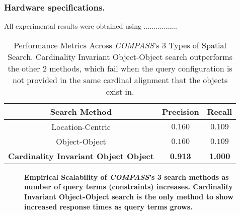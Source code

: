 \subsubsection{Hardware specifications.} 
All experimental results were obtained using .................

\small{
\begin{table}[h]
    \begin{center}
        \begin{tabular}{ |c|c|c| } 
            \hline
            Search Method & Precision & Recall\\
            \hline
            Location-Centric & $0.160$ & $0.109$ \\ 
            Object-Object & $0.160$ & $0.109$ \\  
            \textbf{Cardinality Invariant Object Object} & \textbf{0.913} & \textbf{1.000} \\ 
            \hline     
        \end{tabular}
        \caption{Performance Metrics Across \emph{COMPASS}'s 3 Types of Spatial Search. Cardinality Invariant Object-Object search outperforms the other 2 methods, which fail when the query configuration is not provided in the same cardinal alignment that the objects exist in.} 
        \label{Table:PerformanceResults}
    \end{center}
\end{table}
}

\begin{figure}[h]
    \centering
        
    \caption{\textbf{Empirical Scalability of \emph{COMPASS}'s 3 search methods as number of query terms (constraints) increases. Cardinality Invariant Object-Object search is the only method to show increased response times as query terms grows.}}\label{figure:query-time} 
\end{figure}